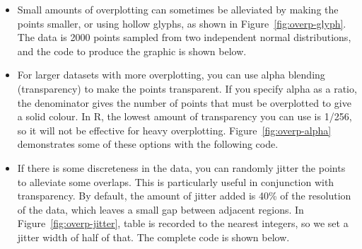 \begin{itemize}

  \item Small amounts of overplotting can sometimes be alleviated by making the points smaller, or using hollow glyphs, as shown in Figure~\ref{fig:overp-glyph}. The data is 2000 points sampled from two independent normal distributions, and the code to produce the graphic is shown below.  

    
  
  \item For larger datasets with more overplotting, you can use alpha blending (transparency) to make the points transparent.  If you specify alpha as a ratio, the denominator gives the number of points that must be overplotted to give a solid colour.  In R, the lowest amount of transparency you can use is 1/256, so it will not be effective for heavy overplotting.  Figure~\ref{fig:overp-alpha} demonstrates some of these options with the following code.   
    
    

  \item If there is some discreteness in the data, you can randomly jitter the points to alleviate some overlaps.  This is particularly useful in conjunction with transparency.  By default, the amount of jitter added is 40\% of the resolution of the data, which leaves a small gap between adjacent regions. In Figure~\ref{fig:overp-jitter}, table is recorded to the nearest integers, so we set a jitter width of half of that.  The complete code is shown below.     
  

\end{itemize}
